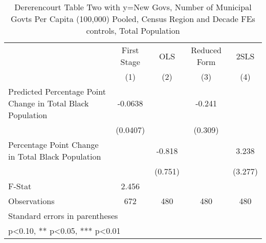 \begin{table}[htbp]\centering
\def\sym#1{\ifmmode^{#1}\else\(^{#1}\)\fi}
\caption{Dererencourt Table Two with y=New Govs, Number of Municipal Govts Per Capita (100,000) Pooled, Census Region and Decade FEs controls, Total Population}
\begin{tabular}{l*{4}{c}}
\toprule
                    & First Stage   &         OLS   &Reduced Form   &        2SLS   \\
                    &\multicolumn{1}{c}{(1)}   &\multicolumn{1}{c}{(2)}   &\multicolumn{1}{c}{(3)}   &\multicolumn{1}{c}{(4)}   \\
\midrule
Predicted Percentage Point Change in Total Black Population&     -0.0638   &               &      -0.241   &               \\
                    &    (0.0407)   &               &     (0.309)   &               \\
\addlinespace
Percentage Point Change in Total Black Population&               &      -0.818   &               &       3.238   \\
                    &               &     (0.751)   &               &     (3.277)   \\
\midrule
F-Stat              &       2.456   &               &               &               \\
Observations        &         672   &         480   &         480   &         480   \\
\bottomrule
\multicolumn{5}{l}{\footnotesize Standard errors in parentheses}\\
\multicolumn{5}{l}{\footnotesize * p<0.10, ** p<0.05, *** p<0.01}\\
\end{tabular}
\end{table}
